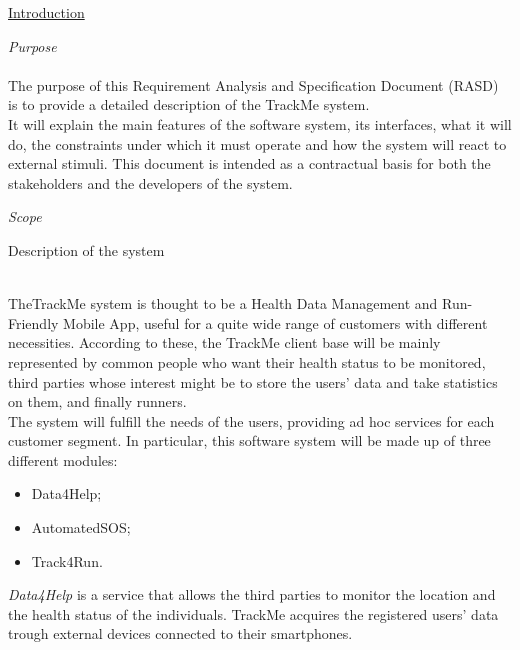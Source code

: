 \documentclass{article}
\begin{document}
\newpage
	\begin{legal}\bfseries
 	\item \underline{Introduction} 
  		\begin{legal}
    		\item \textit{Purpose}\\
		\\
		{\normalfont
		The purpose of this Requirement Analysis and Specification Document (RASD) is to provide a detailed description of the TrackMe system.\\ 
		It will explain the main features of the software system, its interfaces, what it will do, the constraints under which it must operate and how the system will react to external stimuli. This document is intended as a contractual basis for both the stakeholders and the developers of the system.
		}\\
		\item \textit{Scope}\\
			\begin{legal}
    		\item Description of the system \\\\
			{\normalfont
TheTrackMe system is thought to be a Health Data Management and Run-Friendly Mobile App, useful for a quite wide range of customers with different necessities. According to these, the TrackMe client base will be mainly represented by common people who want their health status to be monitored, third parties whose interest might be to store the users' data and take statistics on them, and finally runners.\\ The system will fulfill the needs of the users, providing ad hoc services for each customer segment. In particular, this software system will be  made up of three different modules:\\
		\begin{itemize}
		\item Data4Help;\\
		\item AutomatedSOS;\\
		\item Track4Run.\\
		\end{itemize}
\textit {Data4Help} is a service that allows the third parties to monitor the location and the health status of the individuals. TrackMe acquires the registered users' data trough external devices connected to their smartphones.\\
}
\end{legal}
\end{legal}
\end{legal}
\end{document}
